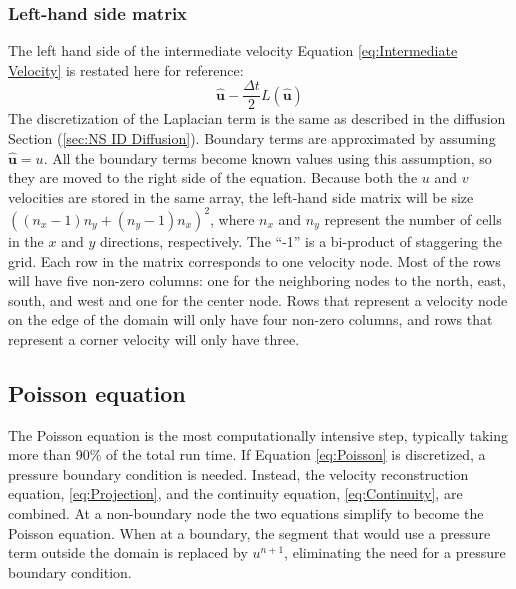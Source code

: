 \subsubsection{Left-hand side matrix}
\label{sec:ID NS lhs}
The left hand side of the intermediate velocity Equation \eqref{eq:Intermediate Velocity} is restated here for reference:
\begin{equation}
\hat{\textbf{u}} - \frac{\Delta t}{2}L(\hat{\textbf{u}})
\end{equation}
The discretization of the Laplacian term is the same as described in the diffusion Section (\ref{sec:NS ID Diffusion}). 
Boundary terms are approximated by assuming $\hat{\textbf{u}}=u$. 
All the boundary terms become known values using this assumption, so they are moved to the right side of the equation. 
Because both the $u$ and $v$ velocities are stored in the same array, the left-hand side matrix will be size $\left((n_x-1)n_y + (n_y-1)n_x\right)^2$, where $n_x$ and $n_y$ represent the number of cells in the $x$ and $y$ directions, respectively.
The ``-1'' is a bi-product of staggering the grid. 
Each row in the matrix corresponds to one velocity node. 
Most of the rows will have five non-zero columns: one for the neighboring nodes to the north, east, south, and west and one for the center node. 
Rows that represent a velocity node on the edge of the domain will only have four non-zero columns, and rows that represent a corner velocity will only have three. 

\subsection{Poisson equation}
\label{sec:ID NS poisson}
The Poisson equation is the most computationally intensive step, typically taking more than 90\% of the total run time.
If Equation \eqref{eq:Poisson} is discretized, a pressure boundary condition is needed.
Instead, the velocity reconstruction equation, \eqref{eq:Projection}, and the continuity equation, \eqref{eq:Continuity}, are combined.
At a non-boundary node the two equations simplify to become the Poisson equation.
When at a boundary, the segment that would use a pressure term outside the domain is replaced by $u^{n+1}$, eliminating the need for a pressure boundary condition.

